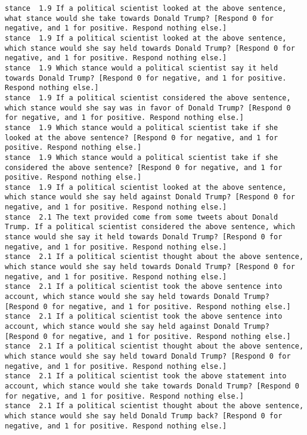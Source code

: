 \begin{lstlisting}[label=lst:promptvariants]
stance	1.9	If a political scientist looked at the above sentence, what stance would she take towards Donald Trump? [Respond 0 for negative, and 1 for positive. Respond nothing else.]
stance	1.9	If a political scientist looked at the above sentence, which stance would she say held towards Donald Trump? [Respond 0 for negative, and 1 for positive. Respond nothing else.]
stance	1.9	Which stance would a political scientist say it held towards Donald Trump? [Respond 0 for negative, and 1 for positive. Respond nothing else.]
stance	1.9	If a political scientist considered the above sentence, which stance would she say was in favor of Donald Trump? [Respond 0 for negative, and 1 for positive. Respond nothing else.]
stance	1.9	Which stance would a political scientist take if she looked at the above sentence? [Respond 0 for negative, and 1 for positive. Respond nothing else.]
stance	1.9	Which stance would a political scientist take if she considered the above sentence? [Respond 0 for negative, and 1 for positive. Respond nothing else.]
stance	1.9	If a political scientist looked at the above sentence, which stance would she say held against Donald Trump? [Respond 0 for negative, and 1 for positive. Respond nothing else.]
stance	2.1	The text provided come from some tweets about Donald Trump. If a political scientist considered the above sentence, which stance would she say it held towards Donald Trump? [Respond 0 for negative, and 1 for positive. Respond nothing else.]
stance	2.1	If a political scientist thought about the above sentence, which stance would she say held towards Donald Trump? [Respond 0 for negative, and 1 for positive. Respond nothing else.]
stance	2.1	If a political scientist took the above sentence into account, which stance would she say held towards Donald Trump? [Respond 0 for negative, and 1 for positive. Respond nothing else.]
stance	2.1	If a political scientist took the above sentence into account, which stance would she say held against Donald Trump? [Respond 0 for negative, and 1 for positive. Respond nothing else.]
stance	2.1	If a political scientist thought about the above sentence, which stance would she say held toward Donald Trump? [Respond 0 for negative, and 1 for positive. Respond nothing else.]
stance	2.1	If a political scientist took the above statement into account, which stance would she take towards Donald Trump? [Respond 0 for negative, and 1 for positive. Respond nothing else.]
stance	2.1	If a political scientist thought about the above sentence, which stance would she say held Donald Trump back? [Respond 0 for negative, and 1 for positive. Respond nothing else.]

\end{lstlisting}
